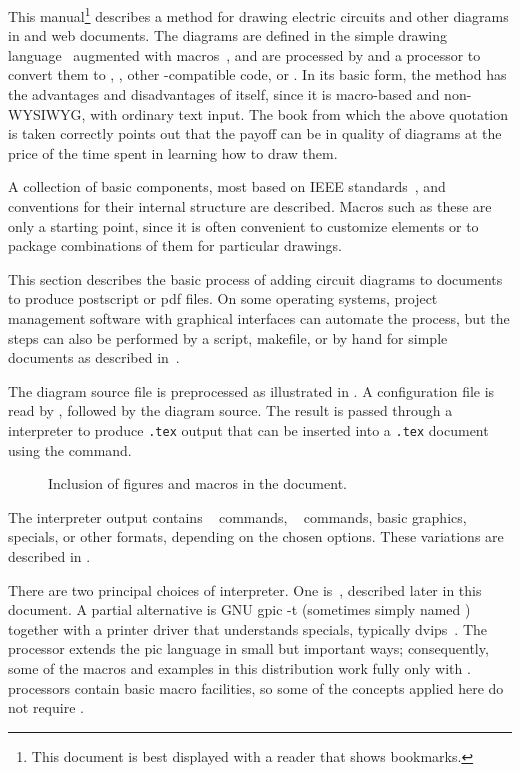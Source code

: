 This manual\footnote{%
This document is best displayed with a reader that shows bookmarks.}
describes a method for drawing electric circuits and
other diagrams in \latex and web documents.
The diagrams are defined in the simple \pic drawing language~\cite{KRpic}
augmented with \Mfour macros~\cite{KRm4}, and are
processed by \Mfour and a \pic processor to
convert them to \TPGF, \PSTricks, other \latex-compatible code, or \SVG.
In its basic form, the method has the advantages and disadvantages of
\tex itself, since it is macro-based and non-WYSIWYG,
with ordinary text input.  The book from which the above quotation
is taken correctly points out that the payoff can be in quality of
diagrams at the price of the time spent in learning how to draw them.

A collection of basic components, most based on IEEE
standards~\cite{IEEEstd},
and conventions for their internal
structure are described.  Macros such as these are only a starting
point, since it is often convenient to customize elements or to package
combinations of them for particular drawings.

This section describes the basic process of adding circuit diagrams to
\latex documents to produce postscript or pdf files.  On some operating
systems, project management software with graphical interfaces can
automate the process, but the steps can also be performed by a script,
makefile, or by hand for simple documents as described in~.

The diagram source file is preprocessed as illustrated in
.  A configuration file is read by \Mfour,
followed by the diagram source.
The result is passed through a
\pic interpreter to produce {\tt .tex} output that can be inserted
into a {\tt .tex} document using the \verb|| command.

\begin{figure}[ht]
 \caption{Inclusion of figures and macros in the \latex document.
 \label{Flowdiag}}
 \end{figure}

\noindent
The interpreter output contains
\TPGF~\cite{tikz} commands,
\PSTricks~\cite{pstricks} commands,
basic \latex graphics, 
\tpic specials, or other formats,
depending on the chosen options.
These variations are described in .

There are two principal choices of \pic interpreter.  One is~\dpic,
described later in this document.  A partial alternative is
GNU {\bq gpic -t} (sometimes simply named \pic)~\cite{gpic}
together with a printer driver
that understands \tpic specials, typically {\bq dvips}~\cite{dvips}.
The \dpic processor extends the pic language in small but important ways;
consequently, some of the macros and examples in this distribution work fully
only with \dpic.
\Pic processors contain basic macro facilities, so some of the
concepts applied here do not require \Mfour.

